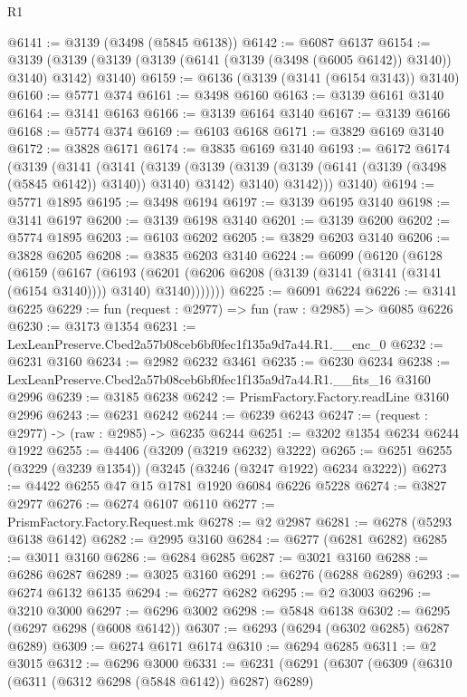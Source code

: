 \begin{lexlean}{R1}
\begin{coremodule}
@6141 := @3139 (@3498 (@5845 @6138))
@6142 := @6087 @6137
@6154 := @3139 (@3139 (@3139 (@3139 (@6141 (@3139 (@3498 (@6005 @6142)) @3140)) @3140) @3142) @3140)
@6159 := @6136 (@3139 (@3141 (@6154 @3143)) @3140)
@6160 := @5771 @374
@6161 := @3498 @6160
@6163 := @3139 @6161 @3140
@6164 := @3141 @6163
@6166 := @3139 @6164 @3140
@6167 := @3139 @6166
@6168 := @5774 @374
@6169 := @6103 @6168
@6171 := @3829 @6169 @3140
@6172 := @3828 @6171
@6174 := @3835 @6169 @3140
@6193 := @6172
    @6174
    (@3139
      (@3141
        (@3141
          (@3139
            (@3139 (@3139 (@3139 (@6141 (@3139 (@3498 (@5845 @6142)) @3140)) @3140) @3142) @3140)
            @3142)))
      @3140)
@6194 := @5771 @1895
@6195 := @3498 @6194
@6197 := @3139 @6195 @3140
@6198 := @3141 @6197
@6200 := @3139 @6198 @3140
@6201 := @3139 @6200
@6202 := @5774 @1895
@6203 := @6103 @6202
@6205 := @3829 @6203 @3140
@6206 := @3828 @6205
@6208 := @3835 @6203 @3140
@6224 := @6099
    (@6120
      (@6128
        (@6159
          (@6167
            (@6193
              (@6201 (@6206 @6208 (@3139 (@3141 (@3141 (@3141 (@6154 @3140)))) @3140) @3140)))))))
@6225 := @6091 @6224
@6226 := @3141 @6225
@6229 := fun (request : @2977) => fun (raw : @2985) => @6085 @6226
@6230 := @3173 @1354
@6231 := LexLeanPreserve.Cbed2a57b08ceb6bf0fec1f135a9d7a44.R1.__enc_0
@6232 := @6231 @3160
@6234 := @2982 @6232 @3461
@6235 := @6230 @6234
@6238 := LexLeanPreserve.Cbed2a57b08ceb6bf0fec1f135a9d7a44.R1.__fits_16 @3160 @2996
@6239 := @3185 @6238
@6242 := PrismFactory.Factory.readLine @3160 @2996
@6243 := @6231 @6242
@6244 := @6239 @6243
@6247 := (request : @2977) -> (raw : @2985) -> @6235 @6244
@6251 := @3202 @1354 @6234 @6244 @1922
@6255 := @4406 (@3209 (@3219 @6232) @3222)
@6265 := @6251 @6255 (@3229 (@3239 @1354)) (@3245 (@3246 (@3247 @1922) @6234 @3222))
@6273 := @4422 @6255 @47 @15 @1781 @1920 @6084 @6226 @5228
@6274 := @3827 @2977
@6276 := @6274 @6107 @6110
@6277 := PrismFactory.Factory.Request.mk
@6278 := @2 @2987
@6281 := @6278 (@5293 @6138 @6142)
@6282 := @2995 @3160
@6284 := @6277 (@6281 @6282)
@6285 := @3011 @3160
@6286 := @6284 @6285
@6287 := @3021 @3160
@6288 := @6286 @6287
@6289 := @3025 @3160
@6291 := @6276 (@6288 @6289)
@6293 := @6274 @6132 @6135
@6294 := @6277 @6282
@6295 := @2 @3003
@6296 := @3210 @3000
@6297 := @6296 @3002
@6298 := @5848 @6138
@6302 := @6295 (@6297 @6298 (@6008 @6142))
@6307 := @6293 (@6294 (@6302 @6285) @6287 @6289)
@6309 := @6274 @6171 @6174
@6310 := @6294 @6285
@6311 := @2 @3015
@6312 := @6296 @3000
@6331 := @6231
    (@6291
      (@6307
        (@6309
          (@6310 (@6311 (@6312 @6298 (@5848 @6142)) @6287) @6289)

\end{coremodule}
\end{lexlean}
